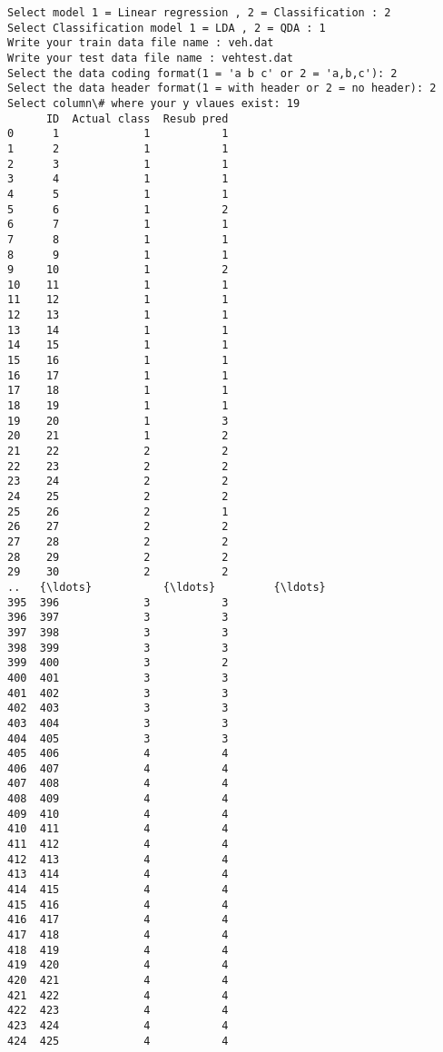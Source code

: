\documentclass[11pt]{article}
\begin{document}
    \begin{Verbatim}[commandchars=\\\{\}]
Select model 1 = Linear regression , 2 = Classification : 2
Select Classification model 1 = LDA , 2 = QDA : 1
Write your train data file name : veh.dat
Write your test data file name : vehtest.dat
Select the data coding format(1 = 'a b c' or 2 = 'a,b,c'): 2
Select the data header format(1 = with header or 2 = no header): 2
Select column\# where your y vlaues exist: 19
      ID  Actual class  Resub pred
0      1             1           1
1      2             1           1
2      3             1           1
3      4             1           1
4      5             1           1
5      6             1           2
6      7             1           1
7      8             1           1
8      9             1           1
9     10             1           2
10    11             1           1
11    12             1           1
12    13             1           1
13    14             1           1
14    15             1           1
15    16             1           1
16    17             1           1
17    18             1           1
18    19             1           1
19    20             1           3
20    21             1           2
21    22             2           2
22    23             2           2
23    24             2           2
24    25             2           2
25    26             2           1
26    27             2           2
27    28             2           2
28    29             2           2
29    30             2           2
..   {\ldots}           {\ldots}         {\ldots}
395  396             3           3
396  397             3           3
397  398             3           3
398  399             3           3
399  400             3           2
400  401             3           3
401  402             3           3
402  403             3           3
403  404             3           3
404  405             3           3
405  406             4           4
406  407             4           4
407  408             4           4
408  409             4           4
409  410             4           4
410  411             4           4
411  412             4           4
412  413             4           4
413  414             4           4
414  415             4           4
415  416             4           4
416  417             4           4
417  418             4           4
418  419             4           4
419  420             4           4
420  421             4           4
421  422             4           4
422  423             4           4
423  424             4           4
424  425             4           4


\end{Verbatim}
\end{document}
